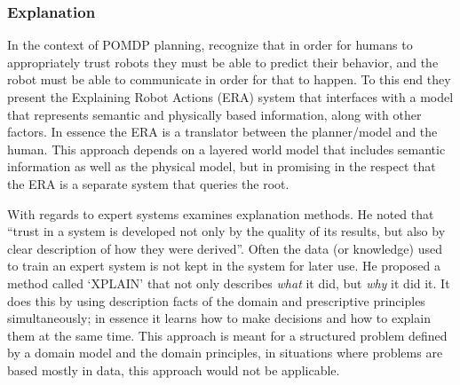 %

\subsubsection{Explanation}
    In the context of POMDP planning, \citet{Lomas2012-ie} recognize that in order for humans to appropriately trust robots they must be able to predict their behavior, and the robot must be able to communicate in order for that to happen. To this end they present the Explaining Robot Actions (ERA) system that interfaces with a model that represents semantic and physically based information, along with other factors. In essence the ERA is a translator between the planner/model and the human. This approach depends on a layered world model that includes semantic information as well as the physical model, but in promising in the respect that the ERA is a separate system that queries the root. 

    With regards to expert systems \citet{Swartout1983-ko} examines explanation methods. He noted that ``trust in a system is developed not only by the quality of its results, but also by clear description of how they were derived''. Often the data (or knowledge) used to train an expert system is not kept in the system for later use. He proposed a method called `XPLAIN' that not only describes \emph{what} it did, but \emph{why} it did it. It does this by using description facts of the domain and prescriptive principles simultaneously; in essence it learns how to make decisions and how to explain them at the same time. This approach is meant for a  structured problem defined by a domain model and the domain principles, in situations where problems are based mostly in data, this approach would not be applicable.

